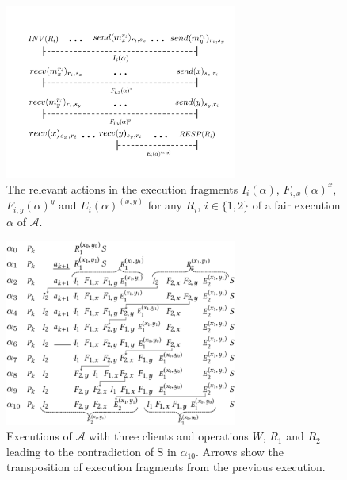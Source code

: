 
\begin{figure}[t]
	\hspace*{-0.0cm}

		\centering
	     \includegraphics[width=3.0in]{figures/executions_3_2.pdf}
	     \caption{\small{
	      The relevant actions in the execution fragments $I_i(\alpha)$, $F_{i,x}(\alpha)^{x}$,    $F_{i,y}(\alpha)^{y}$ and   $E_{i}(\alpha)^{(x,y)}$ for any \rot{} $R_i$, $i \in \{1, 2\}$
			of a fair execution $\alpha$ of $\mathcal{A}$.
	     }}
	     \label{fig:exe3_fragments}
\end{figure}

\begin{figure}[t]
		\centering
		\includegraphics[width=3.0in]{figures/executions_3_1-cropa.pdf}		
		\caption{\small{Executions of $\mathcal{A}$ with three clients and operations $W$, $R_1$ and $R_2$ leading to the contradiction of S in $\alpha_{10}$.
			Arrows show the transposition of execution fragments from the previous execution.
		}}
           	\label{fig:executions3}	
\end{figure}
